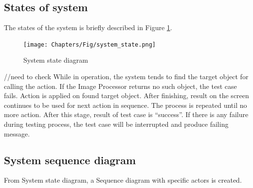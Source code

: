 \subsection{States of system}
The states of the system is briefly described in Figure \ref{fig:system_state}.

    \begin{figure}[H]
		\centering
		\texttt{[image: Chapters/Fig/system\_state.png]}
		\caption{System state diagram}
		\label{fig:system_state}
	\end{figure}

//need to check
While in operation, the system tends to find the target object for calling the action. If the Image Processor returns no such object, the test case fails.
Action is applied on found target object.
After finishing, result on the screen continues to be used for next action in sequence.
The process is repeated until no more action. After this stage, result of test case is ``success''. If there is any failure during testing process, the test case will be interrupted and produce failing message.


\subsection{System sequence diagram}
From System state diagram, a Sequence diagram with specific actors is created.

